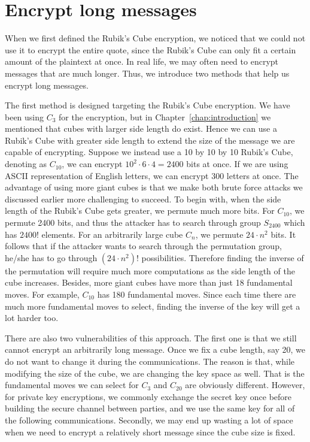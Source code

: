 \section{Encrypt long messages}
\par When we first defined the Rubik's Cube encryption, we noticed that we could not use it to encrypt the entire quote, since the Rubik's Cube can only fit a certain amount of the plaintext at once. In real life, we may often need to encrypt messages that are much longer. Thus, we introduce two methods that help us encrypt long messages.
\par The first method is designed targeting the Rubik's Cube encryption. We have been using $C_3$ for the encryption, but in Chapter~\ref{chap:introduction} we mentioned that cubes with larger side length do exist. Hence we can use a Rubik's Cube with greater side length to extend the size of the message we are capable of encrypting. Suppose we instead use a 10 by 10 by 10 Rubik's Cube, denoting as $C_{10}$, we can encrypt $10^2 \cdot 6 \cdot 4 = 2400$ bits at once. If we are using ASCII representation of English letters, we can encrypt 300 letters at once. The advantage of using more giant cubes is that we make both brute force attacks we discussed earlier more challenging to succeed. To begin with, when the side length of the Rubik's Cube gets greater, we permute much more bits. For $C_{10}$, we permute 2400 bits, and thus the attacker has to search through group $S_{2400}$ which has $2400!$ elements. For an arbitrarily large cube $C_n$, we permute $24 \cdot n^2$ bits. It follows that if the attacker wants to search through the permutation group, he/she has to go through $(24 \cdot n^2)!$ possibilities. Therefore finding the inverse of the permutation will require much more computations as the side length of the cube increases. Besides, more giant cubes have more than just 18 fundamental moves. For example, $C_{10}$ has 180 fundamental moves. Since each time there are much more fundamental moves to select, finding the inverse of the key will get a lot harder too.
\par There are also two vulnerabilities of this approach. The first one is that we still cannot encrypt an arbitrarily long message. Once we fix a cube length, say 20, we do not want to change it during the communications. The reason is that, while modifying the size of the cube, we are changing the key space as well. That is the fundamental moves we can select for $C_3$ and $C_{20}$ are obviously different. However, for private key encryptions, we commonly exchange the secret key once before building the secure channel between parties, and we use the same key for all of the following communications. Secondly, we may end up wasting a lot of space when we need to encrypt a relatively short message since the cube size is fixed.
